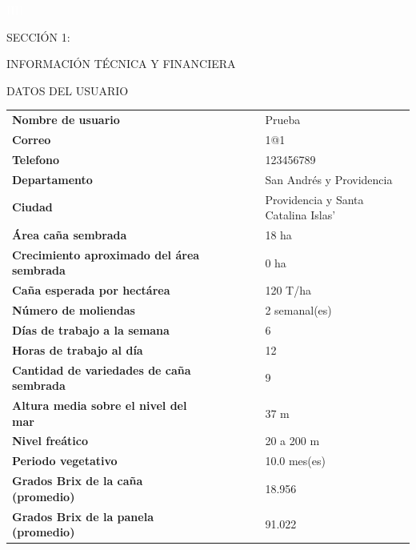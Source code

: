 \documentclass{article}%
\begin{document}
\begin{center}%
\textcolor{white}{ 
HH
}%
\linebreak%
\linebreak%
\linebreak%
\linebreak%
\linebreak%
\linebreak%
\linebreak%
\linebreak%
\linebreak%
\linebreak%
\linebreak%
\linebreak%
\linebreak%
\linebreak%
\linebreak%
\begin{Huge}%
SECCIÓN 1:%
\end{Huge}%
\linebreak%
\begin{Huge}%
INFORMACIÓN TÉCNICA Y FINANCIERA%
\end{Huge}%
\end{center}%
\newpage%
\begin{center}%
\begin{Huge}%
DATOS DEL USUARIO%
\end{Huge}%
\linebreak%
\end{center}%
\begin{tabular}{lccccl}%
\textbf{Nombre de usuario}& & & & &Prueba\\%
\textbf{Correo}& & & & &1@1\\%
\textbf{Telefono}& & & & &123456789\\%
\textbf{Departamento}& & & & &San Andrés y Providencia\\%
\textbf{Ciudad}& & & & &Providencia y Santa Catalina Islas'\\%
\textbf{Área caña sembrada}& & & & &18 ha\\%
\textbf{Crecimiento aproximado del área sembrada}& & & & &0 ha\\%
\textbf{Caña esperada por hectárea}& & & & &120 T/ha\\%
\textbf{Número de moliendas}& & & & &2 semanal(es)\\%
\textbf{Días de trabajo a la semana}& & & & &6\\%
\textbf{Horas de trabajo al día}& & & & &12\\%
\textbf{Cantidad de variedades de caña sembrada}& & & & &9\\%
\textbf{Altura media sobre el nivel del mar}& & & & &37 m\\%
\textbf{Nivel freático}& & & & &20 a 200 m\\%
\textbf{Periodo vegetativo}& & & & &10.0 mes(es)\\%
\textbf{Grados Brix de la caña (promedio)}& & & & &18.956\\%
\textbf{Grados Brix de la panela (promedio)}& & & & &91.022\\%
\end{tabular}%
\end{document}
